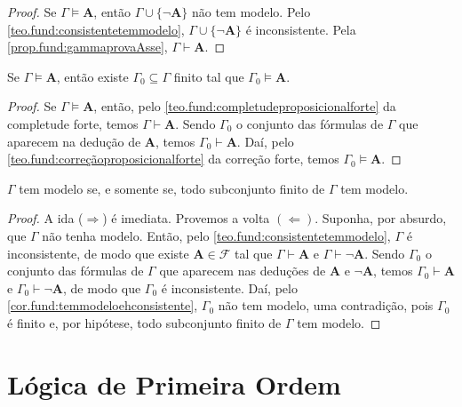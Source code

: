 \begin{proof}
    Se $\Gamma \vDash \mathbf{A}$, então $\Gamma \cup \{\neg \mathbf{A}\}$ não tem modelo. Pelo \cref{teo.fund:consistentetemmodelo}, $\Gamma \cup \{\neg \mathbf{A}\}$ é inconsistente. Pela \cref{prop.fund:gammaprovaAsse}, $\Gamma \vdash \mathbf{A}$. \blackproof
\end{proof}

\begin{proposition}
    Se $\Gamma \vDash \mathbf{A}$, então existe $\Gamma_0 \subseteq \Gamma$ finito tal que $\Gamma_0 \vDash \mathbf{A}$.
\end{proposition}

\begin{proof}
    Se $\Gamma \vDash \mathbf{A}$, então, pelo \cref{teo.fund:completudeproposicionalforte} da completude forte, temos $\Gamma \vdash \mathbf{A}$. Sendo $\Gamma_0$ o conjunto das fórmulas de $\Gamma$ que aparecem na dedução de $\mathbf{A}$, temos $\Gamma_0 \vdash \mathbf{A}$. Daí, pelo \cref{teo.fund:correçãoproposicionalforte} da correção forte, temos $\Gamma_0 \vDash \mathbf{A}$. \blackproof
\end{proof}

\begin{theorem}[Compacidade]
    $\Gamma$ tem modelo se, e somente se, todo subconjunto finito de $\Gamma$ tem modelo.
\end{theorem}

\begin{proof}
    A ida ($\Rightarrow$) é imediata. Provemos a volta $(\Leftarrow)$. Suponha, por absurdo, que $\Gamma$ não tenha modelo. Então, pelo \cref{teo.fund:consistentetemmodelo}, $\Gamma$ é inconsistente, de modo que existe $\mathbf{A} \in \mathcal{F}$ tal que $\Gamma \vdash \mathbf{A}$ e $\Gamma \vdash \neg \mathbf{A}$. Sendo $\Gamma_0$ o conjunto das fórmulas de $\Gamma$ que aparecem nas deduções de $\mathbf{A}$ e $\neg \mathbf{A}$, temos $\Gamma_0 \vdash \mathbf{A}$ e $\Gamma_0 \vdash \neg \mathbf{A}$, de modo que $\Gamma_0$ é inconsistente. Daí, pelo \cref{cor.fund:temmodeloehconsistente}, $\Gamma_0$ não tem modelo, uma contradição, pois $\Gamma_0$ é finito e, por hipótese, todo subconjunto finito de $\Gamma$ tem modelo. \blackproof
\end{proof}

\section{Lógica de Primeira Ordem}

